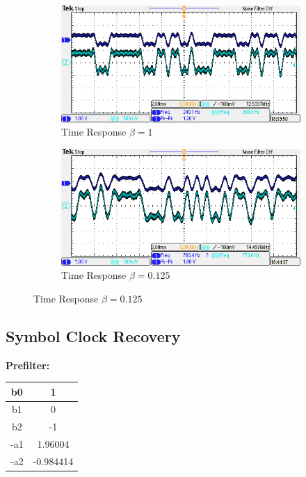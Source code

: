 \documentclass{article}
\begin{document}
\begin{figure}[h]
  \begin{center}

    \begin{subfigure}[b]{\linewidth}
			\includegraphics[width=\textwidth]{img/DSK_implementation_beta_1.png}
      \caption{Time Response $\beta = 1$}
    \end{subfigure}

    \begin{subfigure}[b]{\linewidth}
			\includegraphics[width=\textwidth]{img/DSK_implementation_beta_125.png}
      \caption{Time Response $\beta = 0.125$}
    \end{subfigure}

  \end{center}
\end{figure}

\clearpage
\pagebreak
\subsection{Symbol Clock Recovery}

\textbf{Prefilter:}

\begin{center}
\begin{tabular}{c|c}
b0	&	 1				\\ \hline
b1	&  0				\\ \hline
b2	& -1				\\ \hline
-a1	&	 1.96004	\\ \hline
-a2	&	-0.984414
\end{tabular}
\end{center}
\end{document}
